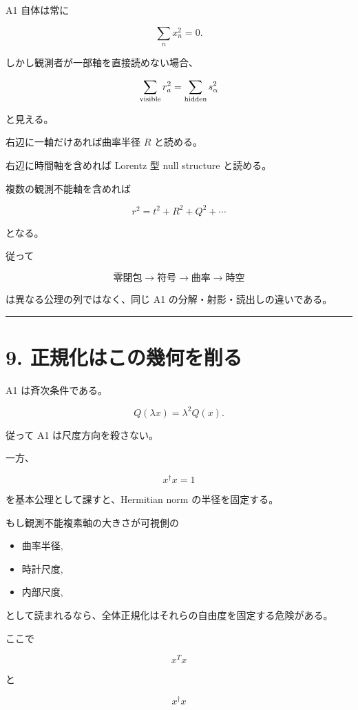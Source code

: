 \documentclass[
  a4paper,
]{ltjsarticle}
\providecommand{\tightlist}{%
  \setlength{\itemsep}{0pt}\setlength{\parskip}{0pt}}
\begin{document}
A1 自体は常に

\[
\sum_nx_n^2=0.
\]

しかし観測者が一部軸を直接読めない場合、

\[
\sum_{\rm visible}r_a^2
=
\sum_{\rm hidden}s_\alpha^2
\]

と見える。

右辺に一軸だけあれば曲率半径 \(R\) と読める。

右辺に時間軸を含めれば Lorentz 型 null structure と読める。

複数の観測不能軸を含めれば

\[
r^2=t^2+R^2+Q^2+\cdots
\]

となる。

従って

\[
\boxed{
\text{零閉包}
\to
\text{符号}
\to
\text{曲率}
\to
\text{時空}
}
\]

は異なる公理の列ではなく、同じ A1 の分解・射影・読出しの違いである。

\begin{center}\rule{0.5\linewidth}{0.5pt}\end{center}

\section{9.
正規化はこの幾何を削る}\label{ux6b63ux898fux5316ux306fux3053ux306eux5e7eux4f55ux3092ux524aux308b}

A1 は斉次条件である。

\[
Q(\lambda x)=\lambda^2Q(x).
\]

従って A1 は尺度方向を殺さない。

一方、

\[
x^\dagger x=1
\]

を基本公理として課すと、Hermitian norm の半径を固定する。

もし観測不能複素軸の大きさが可視側の

\begin{itemize}
\tightlist
\item
  曲率半径,
\item
  時計尺度,
\item
  内部尺度,
\end{itemize}

として読まれるなら、全体正規化はそれらの自由度を固定する危険がある。

ここで

\[
x^Tx
\]

と

\[
x^\dagger x
\]
\end{document}
